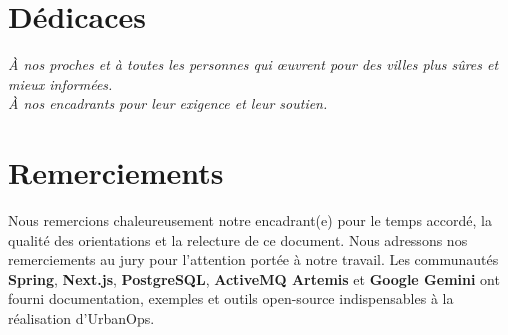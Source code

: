 \documentclass[12pt,a4paper,twoside,openany]{book}
\begin{document}
\clearpage
\frontmatter

\chapter*{Dédicaces}
\thispagestyle{empty}
\vspace*{2.5cm}
\begin{center}
\begin{minipage}{0.82\textwidth}\centering\itshape\large
À nos proches et à toutes les personnes qui œuvrent pour des villes plus sûres et mieux informées.\\[1em]
À nos encadrants pour leur exigence et leur soutien.
\end{minipage}
\end{center}
\clearpage

\chapter*{Remerciements}
\begin{center}
\begin{minipage}{0.88\textwidth}
\justifying
Nous remercions chaleureusement notre encadrant(e) pour le temps accordé, la qualité des orientations et la relecture de ce document. Nous adressons nos remerciements au jury pour l'attention portée à notre travail. Les communautés \textbf{Spring}, \textbf{Next.js}, \textbf{PostgreSQL}, \textbf{ActiveMQ Artemis} et \textbf{Google Gemini} ont fourni documentation, exemples et outils open-source indispensables à la réalisation d'UrbanOps.
\end{minipage}
\end{center}
\clearpage
\end{document}
